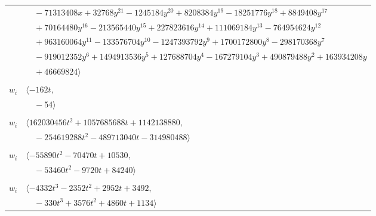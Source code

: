 \documentclass[11pt]{article}
\begin{document}
\begin{longtable}{@{}ll@{}}
 & $\quad -71313408x+32768y^{21}-1245184y^{20}+8208384y^{19}-18251776y^{18}+8849408y^{17}$\\
 & $\quad +70164480y^{16}-213565440y^{15}+227823616y^{14}+111069184y^{13}-764954624y^{12}$\\
 & $\quad +963160064y^{11}-133576704y^{10}-1247393792y^{9}+1700172800y^{8}-298170368y^{7}$\\
 & $\quad -919012352y^{6}+1494913536y^{5}+127688704y^{4}-167279104y^{3}+490879488y^{2}+163934208y$\\
 & $\quad +46669824\rangle$\\
\addlinespace[2pt]
\multicolumn{2}{@{}p{0.97\textwidth}@{}}{$i=9$, $D_i=18$, $e_i=0$, $\rho_{ij}$: $2{:}1, \allowbreak 24{:}1, \allowbreak 28{:}1, \allowbreak 40{:}2$}\\
$w_i$ & $\langle -162t,$\\
 & $\quad -54\rangle$\\
\addlinespace[2pt]
\multicolumn{2}{@{}p{0.97\textwidth}@{}}{$i=10$, $D_i=1944$, $e_i=1$, $\rho_{ij}$: $12{:}2, \allowbreak 16{:}1, \allowbreak 24{:}2, \allowbreak 25{:}2, \allowbreak 29{:}1, \allowbreak 30{:}2, \allowbreak 47{:}2, \allowbreak 54{:}2, \allowbreak 62{:}2, \allowbreak 66{:}1, \allowbreak 71{:}2$}\\
$w_i$ & $\langle 162030456t^{2}+1057685688t+1142138880,$\\
 & $\quad -254619288t^{2}-489713040t-314980488\rangle$\\
\addlinespace[2pt]
\multicolumn{2}{@{}p{0.97\textwidth}@{}}{$i=11$, $D_i=54$, $e_i=0$, $\rho_{ij}$: $1{:}1, \allowbreak 2{:}2, \allowbreak 24{:}2, \allowbreak 29{:}2, \allowbreak 30{:}1, \allowbreak 50{:}1, \allowbreak 60{:}1, \allowbreak 71{:}2$}\\
$w_i$ & $\langle -55890t^{2}-70470t+10530,$\\
 & $\quad -53460t^{2}-9720t+84240\rangle$\\
\addlinespace[2pt]
\multicolumn{2}{@{}p{0.97\textwidth}@{}}{$i=12$, $D_i=16$, $\rho_{ij}$: $2{:}1, \allowbreak 8{:}1, \allowbreak 10{:}1, \allowbreak 13{:}1, \allowbreak 20{:}1, \allowbreak 23{:}2, \allowbreak 27{:}2, \allowbreak 29{:}1, \allowbreak 31{:}2, \allowbreak 36{:}1, \allowbreak 38{:}1, \allowbreak 44{:}1, \allowbreak 45{:}2, \allowbreak 48{:}1, \allowbreak 50{:}1, \allowbreak 54{:}1, \allowbreak 60{:}1, \allowbreak 68{:}2, \allowbreak 69{:}1$}\\
$w_i$ & $\langle -4332t^{3}-2352t^{2}+2952t+3492,$\\
 & $\quad -330t^{3}+3576t^{2}+4860t+1134\rangle$\\

\end{longtable}
\end{document}
